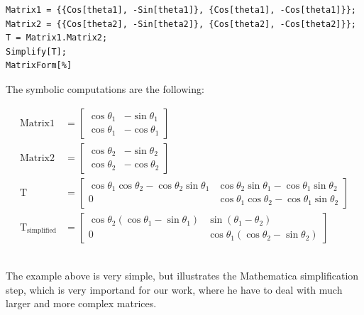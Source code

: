 \begin{scriptsize}
\begin{verbatim}
Matrix1 = {{Cos[theta1], -Sin[theta1]}, {Cos[theta1], -Cos[theta1]}};
Matrix2 = {{Cos[theta2], -Sin[theta2]}, {Cos[theta2], -Cos[theta2]}};
T = Matrix1.Matrix2;
Simplify[T];
MatrixForm[%]
\end{verbatim}
\end{scriptsize}
The symbolic computations are the following:
\begin{small}
\begin{align*}
\text{Matrix1} &= \begin{bmatrix}
\cos\theta_1 & -\sin\theta_1\\
\cos\theta_1 & -\cos\theta_1
\end{bmatrix}\\
\text{Matrix2} &= \begin{bmatrix}
\cos\theta_2 & -\sin\theta_2\\
\cos\theta_2 & -\cos\theta_2
\end{bmatrix}\\
\text{T} &= \begin{bmatrix}
\cos\theta_1\cos\theta_2 - \cos\theta_2\sin\theta_1 &   \cos\theta_2 \sin\theta_1 - \cos\theta_1 \sin\theta_2\\
0 & \cos\theta_1 \cos\theta_2 - \cos\theta_1 \sin\theta_2
\end{bmatrix}\\
\text{T}_{\text{simplified}} &= \begin{bmatrix}
\cos\theta_2\left(\cos\theta_1 - \sin\theta_1\right) & \sin\left(\theta_1 - \theta_2\right)\\
 0 & \cos\theta_1 \left(\cos\theta_2 - \sin\theta_2\right)
\end{bmatrix}
\end{align*}\\
\end{small}

The example above is very simple, but illustrates the Mathematica simplification step, which is very importand for our work, where he have to deal with much larger and more complex matrices.